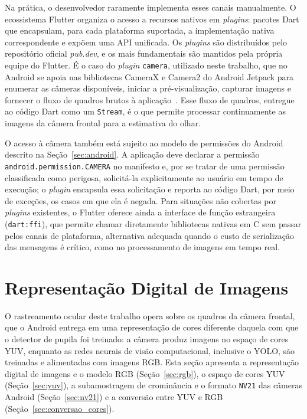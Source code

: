 Na prática, o desenvolvedor raramente implementa esses canais manualmente. O ecossistema Flutter organiza o acesso a recursos nativos em \textit{plugins}: pacotes Dart que encapsulam, para cada plataforma suportada, a implementação nativa correspondente e expõem uma API unificada. Os \textit{plugins} são distribuídos pelo repositório oficial \textit{pub.dev}, e os mais fundamentais são mantidos pela própria equipe do Flutter. É o caso do \textit{plugin} \texttt{camera}, utilizado neste trabalho, que no Android se apoia nas bibliotecas CameraX e Camera2 do Android Jetpack para enumerar as câmeras disponíveis, iniciar a pré-visualização, capturar imagens e fornecer o fluxo de quadros brutos à aplicação~\cite{flutter_camera_plugin}. Esse fluxo de quadros, entregue ao código Dart como um \texttt{Stream}, é o que permite processar continuamente as imagens da câmera frontal para a estimativa do olhar.

O acesso à câmera também está sujeito ao modelo de permissões do Android descrito na Seção~\ref{sec:android}. A aplicação deve declarar a permissão \texttt{android.permission.CAMERA} no manifesto e, por se tratar de uma permissão classificada como perigosa, solicitá-la explicitamente ao usuário em tempo de execução; o \textit{plugin} encapsula essa solicitação e reporta ao código Dart, por meio de exceções, os casos em que ela é negada. Para situações não cobertas por \textit{plugins} existentes, o Flutter oferece ainda a interface de função estrangeira (\texttt{dart:ffi}), que permite chamar diretamente bibliotecas nativas em C sem passar pelos canais de plataforma, alternativa adequada quando o custo de serialização das mensagens é crítico, como no processamento de imagens em tempo real.

\section{Representação Digital de Imagens} \label{sec:imagens}

O rastreamento ocular deste trabalho opera sobre os quadros da câmera frontal, que o Android entrega em uma representação de cores diferente daquela com que o detector de pupila foi treinado: a câmera produz imagens no espaço de cores YUV, enquanto as redes neurais de visão computacional, inclusive o YOLO, são treinadas e alimentadas com imagens RGB. Esta seção apresenta a representação digital de imagens e o modelo RGB (Seção~\ref{sec:rgb}), o espaço de cores YUV (Seção~\ref{sec:yuv}), a subamostragem de crominância e o formato \texttt{NV21} das câmeras Android (Seção~\ref{sec:nv21}) e a conversão entre YUV e RGB (Seção~\ref{sec:conversao_cores}).

